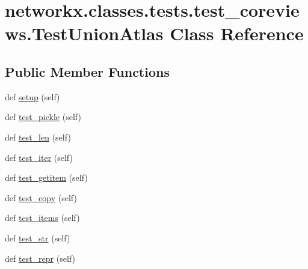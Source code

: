 \hypertarget{classnetworkx_1_1classes_1_1tests_1_1test__coreviews_1_1TestUnionAtlas}{}\section{networkx.\+classes.\+tests.\+test\+\_\+coreviews.\+Test\+Union\+Atlas Class Reference}
\label{classnetworkx_1_1classes_1_1tests_1_1test__coreviews_1_1TestUnionAtlas}
\subsection*{Public Member Functions}
\begin{DoxyCompactItemize}
\item 
def \hyperlink{classnetworkx_1_1classes_1_1tests_1_1test__coreviews_1_1TestUnionAtlas_a812cc6e9f3f8113865b21aeb26a48f18}{setup} (self)
\item 
def \hyperlink{classnetworkx_1_1classes_1_1tests_1_1test__coreviews_1_1TestUnionAtlas_a67e3ec126eaf4d5d495cbf3f251dcd9a}{test\+\_\+pickle} (self)
\item 
def \hyperlink{classnetworkx_1_1classes_1_1tests_1_1test__coreviews_1_1TestUnionAtlas_a70283fcfde8e71bda9d36fdad6946433}{test\+\_\+len} (self)
\item 
def \hyperlink{classnetworkx_1_1classes_1_1tests_1_1test__coreviews_1_1TestUnionAtlas_ad3083344310832fd45a272be2f97dd0e}{test\+\_\+iter} (self)
\item 
def \hyperlink{classnetworkx_1_1classes_1_1tests_1_1test__coreviews_1_1TestUnionAtlas_ab99a1ed4b52f80d2e7908e76d12e06c3}{test\+\_\+getitem} (self)
\item 
def \hyperlink{classnetworkx_1_1classes_1_1tests_1_1test__coreviews_1_1TestUnionAtlas_aa26c0c01b3c1813b7470981dbf4c3115}{test\+\_\+copy} (self)
\item 
def \hyperlink{classnetworkx_1_1classes_1_1tests_1_1test__coreviews_1_1TestUnionAtlas_ac3003137cc08b3e2f08c2ad9d3aacad9}{test\+\_\+items} (self)
\item 
def \hyperlink{classnetworkx_1_1classes_1_1tests_1_1test__coreviews_1_1TestUnionAtlas_a8fad1348fe518f97ffa935b1b714202c}{test\+\_\+str} (self)
\item 
def \hyperlink{classnetworkx_1_1classes_1_1tests_1_1test__coreviews_1_1TestUnionAtlas_abfd5c280604735691ea1dc64aa0d0d7f}{test\+\_\+repr} (self)
\end{DoxyCompactItemize}
